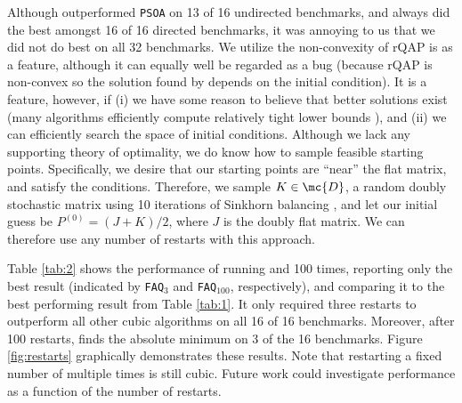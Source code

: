 \documentclass[10pt,journal,cspaper,compsoc]{IEEEtran}
\begin{document}
Although \FAQ outperformed \texttt{PSOA} on 13 of 16 undirected benchmarks, and always did the best amongst 16 of 16 directed benchmarks, it was annoying to us that we did not do best on all 32 benchmarks.  
% 
We utilize the non-convexity of rQAP is as a feature, although it can equally well be regarded as a bug  (because rQAP is non-convex so the solution found by \FAQ depends on the initial condition).  It is a feature, however, if (i) we have some reason to believe that better solutions exist (many algorithms efficiently compute relatively tight lower bounds \cite{Anstreicher2009}), and (ii) we can efficiently search the space of initial conditions.  Although we  lack any supporting theory of optimality, we do know how to sample feasible starting points.  Specifically, we desire that our starting points are ``near'' the flat matrix, and satisfy the conditions.  Therefore, we  sample $K \in \mc{D}$, a random doubly stochastic matrix using 10 iterations of Sinkhorn balancing \cite{Sinkhorn1964}, and let our initial guess be $P^{(0)}=(J+K)/2$, where $J$ is the doubly flat matrix.  We can therefore use any number of restarts with this approach.  

Table \ref{tab:2} shows the performance of running  and 100 times, reporting only the best result (indicated by \texttt{FAQ}$_3$ and \texttt{FAQ}$_{100}$, respectively), and comparing it to the best performing result from Table \ref{tab:1}.  It only required three restarts to outperform all other cubic algorithms on all 16 of 16 benchmarks.  Moreover, after 100 restarts, \FAQ finds the absolute minimum on 3 of the 16 benchmarks. Figure \ref{fig:restarts} graphically demonstrates these results. 
 Note that restarting \FAQ a fixed number of multiple times is still cubic.  Future work could investigate performance as a function of the number of restarts. %
\end{document}
